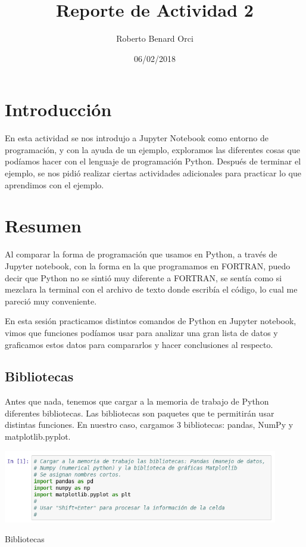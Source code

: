 \documentclass{article}
\title{Reporte de Actividad 2}
\author{Roberto Benard Orci}
\date{06/02/2018}
\begin{document}
\maketitle

\section{Introducción}

En esta actividad se nos introdujo a Jupyter Notebook como entorno de programación, y con la ayuda de un ejemplo, exploramos las diferentes cosas que podíamos hacer con el lenguaje de programación Python. Después de terminar el ejemplo, se nos pidió realizar ciertas actividades adicionales para practicar lo que aprendimos con el ejemplo.

\section{Resumen}

Al comparar la forma de programación que usamos en Python, a través de Jupyter notebook, con la forma en la que programamos en FORTRAN, puedo decir que Python no se sintió muy diferente a FORTRAN, se sentía como si mezclara la terminal con el archivo de texto donde escribía el código, lo cual me pareció muy conveniente. 

En esta sesión practicamos distintos comandos de Python en Jupyter notebook, vimos que funciones podíamos usar para analizar una gran lista de datos y graficamos estos datos para compararlos y hacer conclusiones al respecto.

\subsection{Bibliotecas}

Antes que nada, tenemos que cargar a la memoria de trabajo de Python diferentes bibliotecas. Las bibliotecas son paquetes que te permitirán usar distintas funciones.
En nuestro caso, cargamos 3 bibliotecas: pandas, NumPy y matplotlib.pyplot.

\begin{center}
	\includegraphics[width=12cm]{Act2bibliotecas.png}
    
    Bibliotecas
\end{center}
\vspace{0.3cm}
\end{document}
